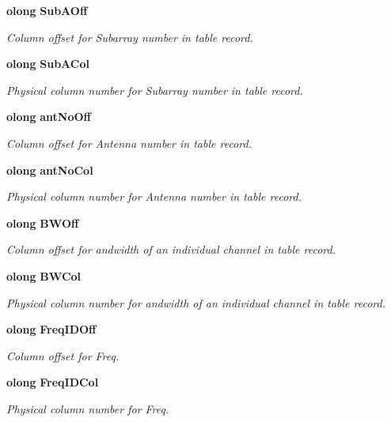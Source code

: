 \begin{CompactItemize}
{\bf olong} {\bf Sub\-AOff}
\begin{CompactList}\small\item\em Column offset for Subarray number in table record. \item\end{CompactList}\item 
{\bf olong} {\bf Sub\-ACol}
\begin{CompactList}\small\item\em Physical column number for Subarray number in table record. \item\end{CompactList}\item 
{\bf olong} {\bf ant\-No\-Off}
\begin{CompactList}\small\item\em Column offset for Antenna number in table record. \item\end{CompactList}\item 
{\bf olong} {\bf ant\-No\-Col}
\begin{CompactList}\small\item\em Physical column number for Antenna number in table record. \item\end{CompactList}\item 
{\bf olong} {\bf BWOff}
\begin{CompactList}\small\item\em Column offset for andwidth of an individual channel in table record. \item\end{CompactList}\item 
{\bf olong} {\bf BWCol}
\begin{CompactList}\small\item\em Physical column number for andwidth of an individual channel in table record. \item\end{CompactList}\item 
{\bf olong} {\bf Freq\-IDOff}
\begin{CompactList}\small\item\em Column offset for Freq. \item\end{CompactList}\item 
{\bf olong} {\bf Freq\-IDCol}
\begin{CompactList}\small\item\em Physical column number for Freq. \item\end{CompactList}\item 

\end{CompactItemize}
